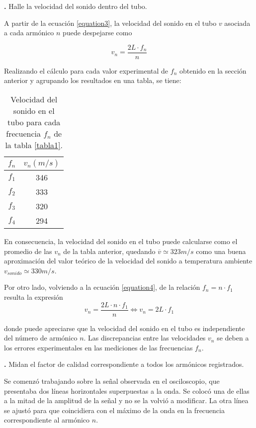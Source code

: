 \documentclass[12pt, a4paper]{article}
\newcounter{step}
\newcommand{\step}[1]
{
  \par\vspace{2ex}
  \stepcounter{step}
  \noindent\textbf{\arabic{step}.} #1\par\vspace{1ex}
}
\begin{document}
\step{Halle la velocidad del sonido dentro del tubo.}

A partir de la ecuación \ref{equation3}, la velocidad del sonido en el tubo $v$ asociada a cada armónico $n$ puede despejarse como

\begin{equation}
  v_{n} = \frac{2L \cdot f_{n}}{n}
  \label{equation4}
\end{equation}

Realizando el cálculo para cada valor experimental de $f_{n}$ obtenido en la sección anterior y agrupando los resultados en una tabla, se tiene:

\begin{table}[H]
    \centering
    \begin{tabular}{|c|c|}
    \hline
    \multirow{1}{2.1cm}{\centering $f_n$} 
        & $v_{n} (m/s)$ \\
    \hline
    $f_1$  & 346 \\ \hline
    $f_2$  & 333 \\ \hline
    $f_3$  & 320 \\ \hline
    $f_4$  & 294  \\ \hline
    \end{tabular}
    \caption{Velocidad del sonido en el tubo para cada frecuencia $f_{n}$ de la tabla \ref{tabla1}.}
    \label{tabla2}
\end{table}

En consecuencia, la velocidad del sonido en el tubo puede calcularse como el promedio de las $v_{n}$ de la tabla anterior, quedando $\overline{v} \simeq 323 m/s$ como una buena aproximación del valor teórico de la velocidad del sonido a temperatura ambiente $v_{sonido}\simeq 330 m/s$.

Por otro lado, volviendo a la ecuación \ref{equation4}, de la relación $f_{n}=n\cdot f_{1}$ resulta la expresión
$$ v_{n} = \frac{2L \cdot n \cdot f_{1}}{n} \Longleftrightarrow v_{n} = 2L \cdot f_{1} $$

donde puede apreciarse que la velocidad del sonido en el tubo es independiente del número de armónico $n$. Las discrepancias entre las velocidades $v_{n}$ se deben a los errores experimentales en las mediciones de las frecuencias $f_{n}$.


\step{Midan el factor de calidad correspondiente a todos los armónicos registrados.}

Se comenzó trabajando sobre la señal observada en el osciloscopio, que presentaba dos líneas horizontales superpuestas a la onda. Se colocó una de ellas a la mitad de la amplitud de la señal y no se la  volvió a modificar. La otra línea se ajustó para que coincidiera con el máximo de la onda en la frecuencia correspondiente al armónico $n$.
\end{document}
